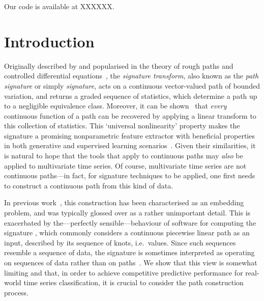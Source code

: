 \documentclass{article}
\begin{document}
Our code is available at XXXXXX.


\section{Introduction}

Originally described by \citet{Chen54, Chen57, Chen58} and popularised
in the theory of rough paths and controlled differential
equations~\cite{lyons1998differential, FritzVictoir10, lyons2014rough},
the \emph{signature transform}, also known as the \emph{path signature}
or simply \emph{signature}, acts on a continuous vector-valued path of
bounded variation, and returns a graded sequence of statistics, which
determine a path up to a negligible equivalence class. Moreover,
it can be shown~\cite[Proposition A.6]{kidger2019deep} that \emph{every}
continuous function of a path can be recovered by applying a linear
transform to this collection of statistics. This `universal
nonlinearity' property makes the signature a promising nonparametric
feature extractor with beneficial properties in both generative and
supervised learning scenarios~\citep{kidger2019deep}.
%
Given their similarities, it is natural to hope that the tools that
apply to continuous paths may \emph{also} be applied to multivariate
time series. Of course, multivariate time series are not continuous
paths---in fact, for signature techniques to be applied, one first needs
to construct a continuous path from this kind of data.

In previous work~\cite{kidger2019deep, levin2013, fermanian2019embedding}, this
construction has been characterised as an embedding problem, and was
typically glossed over as a rather unimportant detail.
%
This is exacerbated by the---perfectly sensible---behaviour of software
for computing the signature \cite{iisignature, signatory}, which
commonly considers a continuous piecewise linear path as an input,
described by its sequence of knots, i.e.\ values.
%
Since such sequences resemble a sequence of data, the signature is
sometimes interpreted as operating on sequences of data rather than on
paths~\cite{kidger2019deep, levin2013}.
%
We show that this view is somewhat limiting and that, in order to
achieve competitive predictive performance for real-world time series
classification, it is crucial to consider the path construction process.
\end{document}
